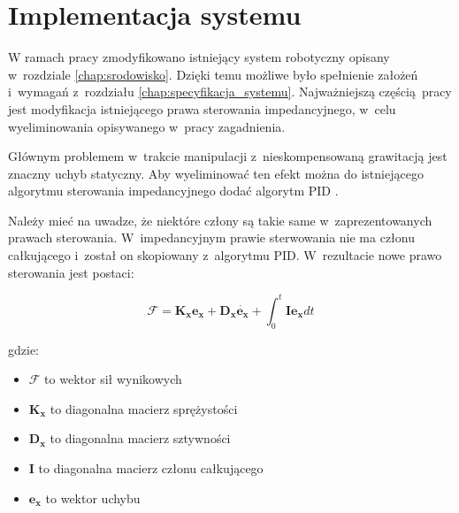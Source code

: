 
\chapter{Implementacja systemu\label{chap:implementacja_systemu}}
W ramach pracy zmodyfikowano istniejący system robotyczny opisany w~rozdziale \ref{chap:srodowisko}. Dzięki temu możliwe było spełnienie założeń i~wymagań z~rozdziału \ref{chap:specyfikacja_systemu}.  Najważniejszą częścią pracy jest modyfikacja istniejącego prawa sterowania impedancyjnego, w~celu wyeliminowania opisywanego w~pracy zagadnienia.

Głównym problemem w~trakcie manipulacji z~nieskompensowaną grawitacją jest znaczny uchyb statyczny. Aby wyeliminować ten efekt można do istniejącego algorytmu sterowania impedancyjnego dodać algorytm PID \cite{bib:gravity2}. 

Należy mieć na uwadze, że niektóre człony są takie same w~zaprezentowanych prawach sterowania. W~impedancyjnym prawie sterwowania nie ma członu całkującego i~został on skopiowany z~algorytmu PID. W~rezultacie nowe prawo sterowania jest postaci:

\begin{equation}
\boldsymbol{\mathcal{F}} = \boldsymbol{K_x}\boldsymbol{e_x} + \boldsymbol{D_x}\dot{\boldsymbol{e_x}} + \int_{0}^{t}  \boldsymbol{I}\boldsymbol{e_x}dt
\end{equation}

gdzie:
\begin{itemize}
    \item $\boldsymbol{\mathcal{F}}$ to wektor sił wynikowych
    \item $\boldsymbol{K_x}$ to diagonalna macierz sprężystości
    \item $\boldsymbol{D_x}$ to diagonalna macierz sztywności
    \item $\boldsymbol{I}$ to diagonalna macierz członu całkującego
    \item $\boldsymbol{e_x}$ to wektor uchybu
\end{itemize}
